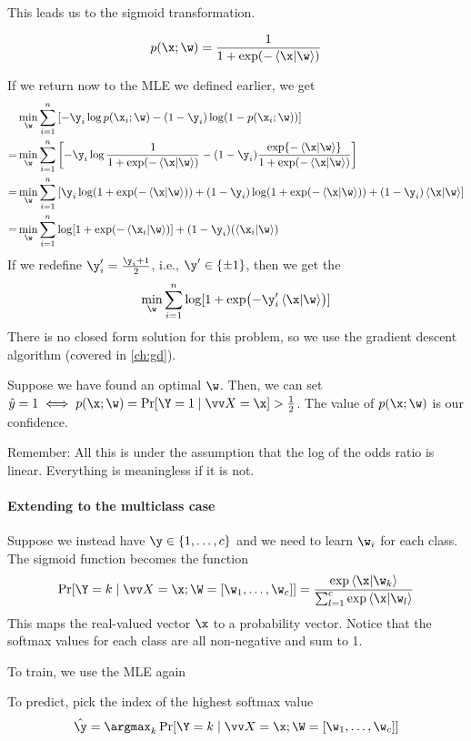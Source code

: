 \documentclass[class=cs480,notes,tikz]{agony}
\begin{document}
This leads us to the sigmoid transformation.
\begin{defn}
  \[p(\x;\w) = \frac{1}{1+\exp(-\ip{\x}{\w})}\]
\end{defn}

If we return now to the MLE we defined earlier, we get
\begin{align*}
    & \min_{\w}\sum_{i=1}^n\qty[-\y_i\log p(\x_i;\w)-(1-\y_i)\log(1-p(\x_i;\w))]                                                   \\
  = & \min_{\w}\sum_{i=1}^n\qty[-\y_i\log \frac{1}{1+\exp(-\ip{\x}{\w})} -(1-\y_i)\frac{\exp{-\ip{\x}{\w}}}{1+\exp(-\ip{\x}{\w})}] \\
  = & \min_{\w}\sum_{i=1}^n\qty[\y_i\log(1+\exp(-\ip{\x}{\w}))+(1-\y_i)\log(1+\exp(-\ip{\x}{\w})) + (1-\y_i)\ip{\x}{\w}]           \\
  = & \min_{\w}\sum_{i=1}^n \log[1+\exp(-\ip{\x_i}{\w})] + (1-\y_i)(\ip{\x_i}{\w})
\end{align*}
If we redefine $\y'_i = \frac{\y_i+1}{2}$, i.e., $\y' \in \{\pm1\}$,
then we get the 
\[ \min_{\w} \sum_{i=1}^n \log[1+\exp(-\y'_i\ip{\x}{\w})] \]
There is no closed form solution for this problem,
so we use the gradient descent algorithm (covered in \cref{ch:gd}).

Suppose we have found an optimal $\w$.
Then, we can set $\hat y = 1 \iff p(\x;\w) = \Pr[\Y=1\mid\vv X=\x] > \frac12$.
The value of $p(\x;\w)$ is our confidence.

Remember: All this is under the assumption that the log of the odds ratio is linear.
Everything is meaningless if it is not.

\paragraph{Extending to the multiclass case}
Suppose we instead have $\y \in \{1,\dotsc,c\}$ and we need to learn $\w_i$ for each class.
The sigmoid function becomes the  function
\[
  \Pr[\Y = k \mid \vv X = \x; \W = [\w_1,\dotsc,\w_c]]
  = \frac{\exp\ip{\x}{\w_k}}{\sum_{l=1}^c\exp\ip{\x}{\w_l}}
\]
This maps the real-valued vector $\x$ to a probability vector.
Notice that the softmax values for each class are all non-negative and sum to 1.

To train, we use the MLE again

To predict, pick the index of the highest softmax value
\[ \hat{\y} = \argmax_k \Pr[\Y = k \mid \vv X = \x; \W = [\w_1,\dotsc,\w_c]] \]
\end{document}
